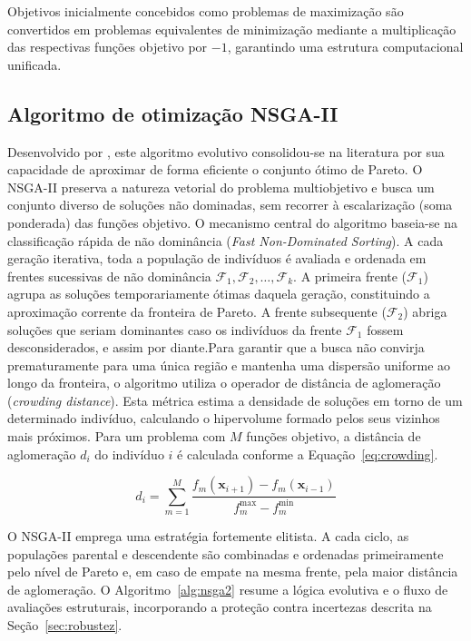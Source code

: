 Objetivos inicialmente concebidos como problemas de maximização são convertidos em problemas equivalentes de minimização mediante a multiplicação das respectivas funções objetivo por $-1$, garantindo uma estrutura computacional unificada.

 \subsection{Algoritmo de otimização NSGA-II} \label{sec:nsga2}
 
 Desenvolvido por \textcite{DEB2009}, este algoritmo evolutivo consolidou-se na literatura por sua capacidade de aproximar de forma eficiente o conjunto ótimo de Pareto. 
O NSGA-II preserva a natureza vetorial do problema multiobjetivo e busca um conjunto diverso de soluções não dominadas, sem recorrer à escalarização (soma ponderada) das funções objetivo.
O mecanismo central do algoritmo baseia-se na classificação rápida de não dominância (\textit{Fast Non-Dominated Sorting}).
A cada geração iterativa, toda a população de indivíduos é avaliada e ordenada em frentes sucessivas de não dominância $\mathcal{F}_1, \mathcal{F}_2, \ldots, \mathcal{F}_k$.
A primeira frente ($\mathcal{F}_1$) agrupa as soluções temporariamente ótimas daquela geração, constituindo a aproximação corrente da fronteira de Pareto.
A frente subsequente ($\mathcal{F}_2$) abriga soluções que seriam dominantes caso os indivíduos da frente $\mathcal{F}_1$ fossem desconsiderados, e assim por diante.Para garantir que a busca não convirja prematuramente para uma única região e mantenha uma dispersão uniforme ao longo da fronteira, o algoritmo utiliza o operador de distância de aglomeração (\textit{crowding distance}).
Esta métrica estima a densidade de soluções em torno de um determinado indivíduo, calculando o hipervolume formado pelos seus vizinhos mais próximos.
Para um problema com $M$ funções objetivo, a distância de aglomeração $d_i$ do indivíduo $i$ é calculada conforme a Equação~\eqref{eq:crowding}.
 
 \begin{equation}d_i = \sum_{m=1}^{M} \frac{f_m(\mathbf{x}_{i+1}) - f_m(\mathbf{x}_{i-1})}{f_m^{\max} - f_m^{\min}}
 \label{eq:crowding}
 \end{equation}
 
O NSGA-II emprega uma estratégia fortemente elitista.
A cada ciclo, as populações parental e descendente são combinadas e ordenadas primeiramente pelo nível de Pareto e, em caso de empate na mesma frente, pela maior distância de aglomeração.
O Algoritmo~\ref{alg:nsga2} resume a lógica evolutiva e o fluxo de avaliações estruturais, incorporando a proteção contra incertezas descrita na Seção~\ref{sec:robustez}.
 

